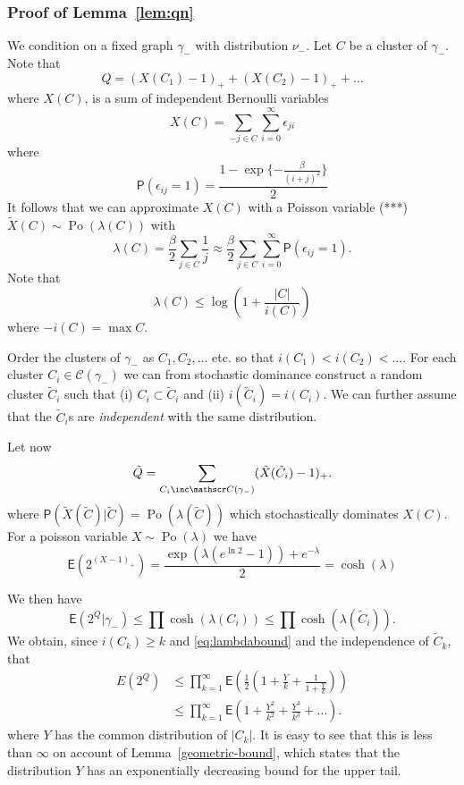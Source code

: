 \documentclass[11pt, a4paper]{amsart}
\theoremstyle{definition}
\theoremstyle{remark}
\providecommand{\qr}{\eqref}
\providecommand{\mscr}{\mathscr}
\providecommand{\opn}{\operatorname}
\renewcommand{\P}{\mathsf{P}}
\providecommand{\E}{\mathsf{E}}
\providecommand{\e}{\epsilon}
\providecommand{\tl}{\tilde}
\providecommand{\g}{\gamma}
\begin{document}
\subsubsection*{Proof of Lemma~\ref{lem:qn}}

We condition on a fixed graph $\g_-$ with distribution $\nu_-$. Let $C$ be a
cluster of $\g_-$. Note that
$$ Q=(X(C_1) -1)_{+} +(X(C_2)-1)_{+} + \ldots $$
where $X(C)$, is a sum of independent Bernoulli variables
$$ X(C) = \sum_{-j\in C} \sum_{i=0}^\infty \e_{ji} $$
where
$$
\P(\e_{ij}=1) = \frac{1- \exp\{-\frac \beta{(i+j)^2}\}}{2}
$$
It follows that we can approximate $X(C)$ with a Poisson variable (***)
$\tl X(C) \sim \opn{Po}(\lambda(C))$ with
$$
\lambda(C) = \frac{\beta}{2} \sum_{j\in C} \frac 1j
\approx \frac{\beta}{2} \sum_{j\in C} \sum_{i=0}^\infty \P(\e_{ij}=1).
$$
Note that
\begin{equation}
  \label{eq:lambdabound}
    \lambda(C) \leq \log \left(1+\frac{|C|}{i(C)}\right)
\end{equation}
where $-i(C)=\max C$.

Order the clusters of $\g_-$ as $C_1,C_2,\dots$ etc. so that
$i(C_1)<i(C_2)<\dots$. For each cluster $C_i\in\mscr C(\gamma_-)$ we can from
stochastic dominance construct a random cluster $\tl C_i$ such that (i)
$C_i \subset \tl C_i$ and (ii) $i(\tl C_i)=i(C_i)$. We can further assume that the
$\tl C_i$s are \emph{independent} with the same distribution.

Let now
\[
  \tl Q = \sum_{C_i\inc\mscr C(\gamma_-)} (\tl X(\tl C_i) - 1)_+.
\]
where $\P(\tl X(\tl C)| \tl C) = \opn{Po}(\lambda(\tl C))$ which stochastically
dominates $X(C)$. For a poisson variable $X\sim\opn{Po}(\lambda)$ we have
\[
  \E(2^{(X-1)_+}) = \frac{\exp(\lambda(e^{\ln 2}-1)) + e^{-\lambda}}{2} = \cosh(\lambda)
\]

We then have
$$
\E(2^Q | \gamma_- ) \leq \prod \cosh (\lambda(C_i))\leq \prod \cosh (\lambda (\tilde C_i)).
$$
We obtain, since $i(C_k)\geq k$ and \qr{eq:lambdabound} and the independence of
$\tl C_k$, that
\begin{align}
  E(2^Q) &\leq \prod_{k=1}^\infty \E\left(\frac{1}{2}\left(1+\frac{Y}{k}+\frac{1}{1+\frac{Y}{k}}\right) \right) \\
         &\leq \prod_{k=1}^\infty \E\left(1+\frac{Y^2}{k^2} + \frac{Y^3}{k^3} + \dots \right).
\end{align}
where $Y$ has the common distribution of $|C_k|$. It is easy to see that this is
less than $\infty$ on account of Lemma~\ref{geometric-bound}, which states that the
distribution $Y$ has an exponentially decreasing bound for the upper tail.
\end{document}
